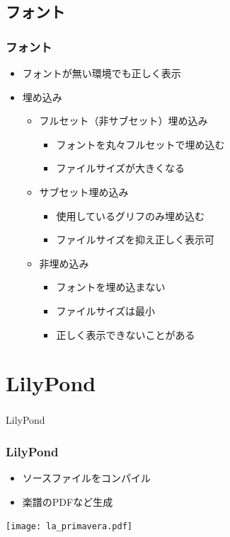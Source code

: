 \documentclass[unicode,17pt]{beamer}
\begin{document}
\subsection{フォント}
\begin{frame}\frametitle{フォント}
  \begin{itemize}
  \item フォントが無い環境でも正しく表示
  \item 埋め込み
    \begin{itemize}
    \item フルセット（非サブセット）埋め込み
      \begin{itemize}
      \item フォントを丸々フルセットで埋め込む
      \item ファイルサイズが大きくなる
      \end{itemize}
    \item サブセット埋め込み
      \begin{itemize}
      \item 使用しているグリフのみ埋め込む
      \item ファイルサイズを抑え正しく表示可
      \end{itemize}
    \item 非埋め込み
      \begin{itemize}
      \item フォントを埋め込まない
      \item ファイルサイズは最小
      \item 正しく表示できないことがある
      \end{itemize}
    \end{itemize}
  \end{itemize}
\end{frame}

\section{LilyPond}
\begin{frame}\frametitle{}
  \centering
  LilyPond
\end{frame}

\begin{frame}\frametitle{LilyPond}
  \begin{itemize}
  \item ソースファイルをコンパイル
  \end{itemize}
  \centering
  \tcbox[left=0mm,right=0mm,top=0mm,bottom=0mm]%
        {}
  \begin{itemize}
  \item 楽譜のPDFなど生成
  \end{itemize}
  \centering
  \texttt{[image: la\_primavera.pdf]}
\end{frame}
\end{document}
